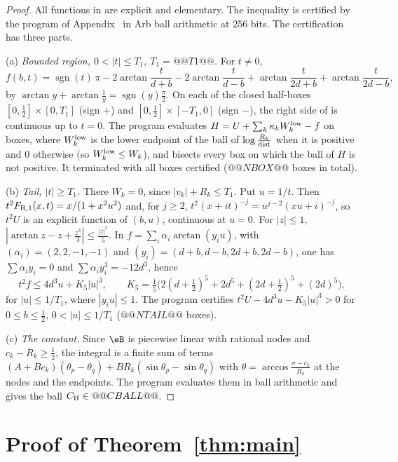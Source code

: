 \begin{proof}
All functions in  are explicit and elementary. The inequality is certified by the program of Appendix~ in Arb ball arithmetic \cite{Johansson2017} at $256$ bits. The certification has three parts.

(a) \emph{Bounded region, $0<|t|\le T_1$, $T_1=@@T1@@$.} For $t\ne0$,
\begin{equation}
f(b,t)=\operatorname{sgn}(t)\,\pi-2\arctan\frac t{d+b}-2\arctan\frac t{d-b}+\arctan\frac t{2d+b}+\arctan\frac t{2d-b},
\label{eq:f_regular}
\end{equation}
by $\arctan y+\arctan\frac1y=\operatorname{sgn}(y)\frac\pi2$. On each of the closed half-boxes $[0,\frac12]\times[0,T_1]$ (sign $+$) and $[0,\frac12]\times[-T_1,0]$ (sign $-$), the right side of  is continuous up to $t=0$. The program evaluates $H=U+\sum_k\kappa_kW_k^{\rm low}-f$ on boxes, where $W_k^{\rm low}$ is the lower endpoint of the ball of $\log\frac{R_k}{\rm dist}$ when it is positive and $0$ otherwise (so $W_k^{\rm low}\le W_k$), and bisects every box on which the ball of $H$ is not positive. It terminated with all boxes certified ($@@NBOX@@$ boxes in total).

(b) \emph{Tail, $|t|\ge T_1$.} There $W_k=0$, since $|v_k|+R_k\le T_1$. Put $u=1/t$. Then $t^2F_{{\rm R},1}(x,t)=x/(1+x^2u^2)$ and, for $j\ge2$, $t^2(x+it)^{-j}=u^{j-2}(xu+i)^{-j}$, so $t^2U$ is an explicit function of $(b,u)$, continuous at $u=0$. For $|z|\le1$, $|\arctan z-z+\frac{z^3}3|\le\frac{|z|^5}5$. In $f=\sum_i\alpha_i\arctan(y_iu)$, with $(\alpha_i)=(2,2,-1,-1)$ and $(y_i)=(d+b,d-b,2d+b,2d-b)$, one has $\sum\alpha_iy_i=0$ and $\sum\alpha_iy_i^3=-12d^3$, hence
\[
t^2f\le4d^3u+K_5|u|^3,\qquad K_5=\tfrac15\bigl(2(d+\tfrac12)^5+2d^5+(2d+\tfrac12)^5+(2d)^5\bigr),
\]
for $|u|\le1/T_1$, where $|y_iu|\le1$. The program certifies $t^2U-4d^3u-K_5|u|^3>0$ for $0\le b\le\frac12$, $0<|u|\le1/T_1$ ($@@NTAIL@@$ boxes).

(c) \emph{The constant.} Since $\eB$ is piecewise linear with rational nodes and $c_k-R_k\ge\frac12$, the integral  is a finite sum of terms $(A+Bc_k)(\theta_p-\theta_q)+BR_k(\sin\theta_p-\sin\theta_q)$ with $\theta=\arccos\frac{\sigma-c_k}{R_k}$ at the nodes and the endpoints. The program evaluates them in ball arithmetic and gives the ball $C_{\rm H}\in@@CBALL@@$.
\end{proof}

\section{Proof of Theorem~\ref{thm:main}}\label{sec:proof}

